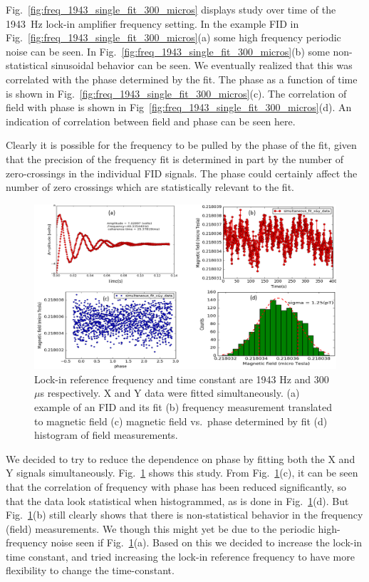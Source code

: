 Fig.~\ref{fig:freq_1943_single_fit_300_micros} displays study over
time of the 1943~Hz lock-in amplifier frequency setting.  In the
example FID in Fig.~\ref{fig:freq_1943_single_fit_300_micros}(a) some
high frequency periodic noise can be seen.  In
Fig.~\ref{fig:freq_1943_single_fit_300_micros}(b) some non-statistical
sinusoidal behavior can be seen.  We eventually realized that this was
correlated with the phase determined by the fit.  The phase as a
function of time is shown in
Fig.~\ref{fig:freq_1943_single_fit_300_micros}(c).  The correlation of
field with phase is shown in
Fig~\ref{fig:freq_1943_single_fit_300_micros}(d).  An indication of
correlation between field and phase can be seen here.

Clearly it is possible for the frequency to be pulled by the phase of
the fit, given that the precision of the frequency fit is determined
in part by the number of zero-crossings in the individual FID signals.
The phase could certainly affect the number of zero crossings which
are statistically relevant to the fit.

\begin{figure}%
\centering\includegraphics[width=0.8\linewidth]{figures/freq_1943_simultaneous_fit_300microsec_.png}
\caption{Lock-in reference frequency and time constant are 1943 Hz and
  300~$\mu$s respectively.  X and Y data were fitted simultaneously.
  (a) example of an FID and its fit (b) frequency measurement
  translated to magnetic field (c) magnetic field vs.~phase determined
  by fit (d) histogram of field
  measurements.\label{fig:freq_1943_simultaneous_fit_300_micro_sec}}
\end{figure}

We decided to try to reduce the dependence on phase by fitting both
the X and Y signals simultaneously.
Fig.~\ref{fig:freq_1943_simultaneous_fit_300_micro_sec} shows this
study.  From
Fig.~\ref{fig:freq_1943_simultaneous_fit_300_micro_sec}(c), it can be
seen that the correlation of frequency with phase has been reduced
significantly, so that the data look statistical when histogrammed, as
is done in Fig.~\ref{fig:freq_1943_simultaneous_fit_300_micro_sec}(d).
But Fig.~\ref{fig:freq_1943_simultaneous_fit_300_micro_sec}(b) still
clearly shows that there is non-statistical behavior in the frequency
(field) measurements.  We though this might yet be due to the periodic
high-frequency noise seen if
Fig.~\ref{fig:freq_1943_simultaneous_fit_300_micro_sec}(a).  Based on
this we decided to increase the lock-in time constant, and tried
increasing the lock-in reference frequency to have more flexibility to
change the time-constant.

